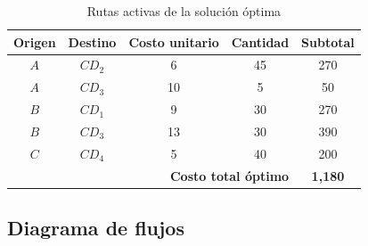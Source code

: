 \documentclass{article}
\renewcommand{\arraystretch}{2.4}
\begin{document}
	\begin{table}[ht]
		\centering
		\renewcommand{\arraystretch}{1.5}
		\begin{tabular}{ccccc}
			\toprule
			\textbf{Origen} & \textbf{Destino} & \textbf{Costo unitario} & \textbf{Cantidad} & \textbf{Subtotal} \\
			\midrule
			$A$ & $CD_2$ & 6  & 45 & 270 \\
			$A$ & $CD_3$ & 10 & 5  & 50  \\
			$B$ & $CD_1$ & 9  & 30 & 270 \\
			$B$ & $CD_3$ & 13 & 30 & 390 \\
			$C$ & $CD_4$ & 5  & 40 & 200 \\
			\midrule
			\multicolumn{4}{r}{\textbf{Costo total óptimo}} & \textbf{1{,}180} \\
			\bottomrule
		\end{tabular}
		\caption{Rutas activas de la solución óptima}
	\end{table}
	
	\subsection{Diagrama de flujos}
	
\end{document}

